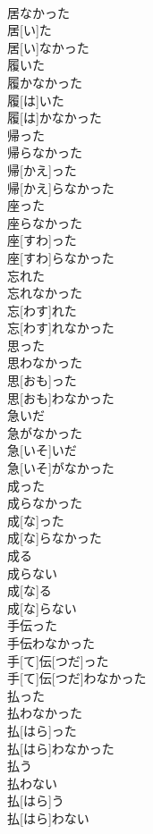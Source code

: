 \documentclass[8pt]{extreport}
\begin{document}
\begin{CJK}{UTF8}{min}
\\	居なかった	
\\	居[い]た 
\\	居[い]なかった
\\	履いた 
\\	履かなかった	
\\	履[は]いた 
\\	履[は]かなかった
\\	帰った 
\\	帰らなかった	
\\	帰[かえ]った 
\\	帰[かえ]らなかった
\\	座った 
\\	座らなかった	
\\	座[すわ]った 
\\	座[すわ]らなかった
\\	忘れた 
\\	忘れなかった	
\\	忘[わす]れた 
\\	忘[わす]れなかった
\\	思った 
\\	思わなかった	
\\	思[おも]った 
\\	思[おも]わなかった
\\	急いだ 
\\	急がなかった	
\\	急[いそ]いだ 
\\	急[いそ]がなかった
\\	成った 
\\	成らなかった	
\\	成[な]った 
\\	成[な]らなかった
\\	成る 
\\	成らない	
\\	成[な]る 
\\	成[な]らない
\\	手伝った 
\\	手伝わなかった	
\\	手[て]伝[つだ]った 
\\	手[て]伝[つだ]わなかった
\\	払った 
\\	払わなかった	
\\	払[はら]った 
\\	払[はら]わなかった
\\	払う 
\\	払わない	
\\	払[はら]う 
\\	払[はら]わない

\end{CJK}
\end{document}
